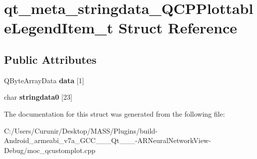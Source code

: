 \hypertarget{structqt__meta__stringdata___q_c_p_plottable_legend_item__t}{}\section{qt\+\_\+meta\+\_\+stringdata\+\_\+\+Q\+C\+P\+Plottable\+Legend\+Item\+\_\+t Struct Reference}
\label{structqt__meta__stringdata___q_c_p_plottable_legend_item__t}
\subsection*{Public Attributes}
\begin{DoxyCompactItemize}
\item 
\mbox{\label{structqt__meta__stringdata___q_c_p_plottable_legend_item__t_aab85197e1d1428be8d100d1bf9fb0bca}} 
Q\+Byte\+Array\+Data {\bfseries data} \mbox{[}1\mbox{]}
\item 
\mbox{\label{structqt__meta__stringdata___q_c_p_plottable_legend_item__t_a73458b21beec58c626482da21cef3e32}} 
char {\bfseries stringdata0} \mbox{[}23\mbox{]}
\end{DoxyCompactItemize}


The documentation for this struct was generated from the following file\+:\begin{DoxyCompactItemize}
\item 
C\+:/\+Users/\+Curunir/\+Desktop/\+M\+A\+S\+S/\+Plugins/build-\/\+Android\+\_\+armeabi\+\_\+v7a\+\_\+\+G\+C\+C\+\_\+\_\+\_\+\+Qt\+\_\+\_\+\_-\/\+A\+R\+Neural\+Network\+View-\/\+Debug/moc\+\_\+qcustomplot.\+cpp\end{DoxyCompactItemize}
